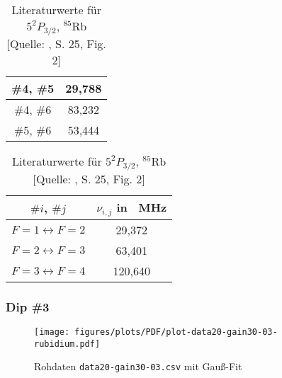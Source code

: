 \begin{table}[H]
\begin{minipage}{8cm}
\begin{tabular}{|c|c|}
            \hline
            \cellcolor{red!20}   \#4, \#5       &   \cellcolor{red!20}       29,788         \\
            \hline
            \cellcolor{green!40} \#4, \#6       &   \cellcolor{green!40}     83,232         \\
            \hline
            \cellcolor{red!20}   \#5, \#6       &   \cellcolor{red!20}       53,444         \\
            \hline
        \end{tabular}
        \caption{Errechnete Frequenzabstände  der Peaks für Dip \textcolor{green!50!black}{\#2}}
        \label{tab:plot-data20-gain30-01-dip-2}
    \end{minipage}
    \hskip0.5cm
    \begin{minipage}{8cm}
        \centering
        \begin{tabular}{|c|c|}
            \hline
            $\#i$, $\#j$    &   $\nu_{i,j}$ in \SI{}{\mega \hertz}  \\
            \hline
            \hline
             $F = 1 \longleftrightarrow F = 2$      &        29,372     \\
            \hline
             $F = 2 \longleftrightarrow F = 3$      &        63,401     \\
            \hline
             $F = 3 \longleftrightarrow F = 4$      &       120,640     \\
            \hline
        \end{tabular}
        \caption{Literaturwerte für $5^{2}P_{3/2}$, $^{85}\text{Rb}$ [Quelle: \cite{Steck85}, S. 25, Fig. 2]}
        \label{tab:lit-5p-85-rb}
    \end{minipage}
\end{table}

\subsubsection{Dip \textcolor{pink!50!purple}{\#3}}

\begin{figure}[H]
    \centering
    \texttt{[image: figures/plots/PDF/plot-data20-gain30-03-rubidium.pdf]}
    \caption{Rohdaten \lstinline{data20-gain30-03.csv} mit Gauß-Fit}
    \label{fig:plot-data20-gain30-03-rubidium}
\end{figure}

